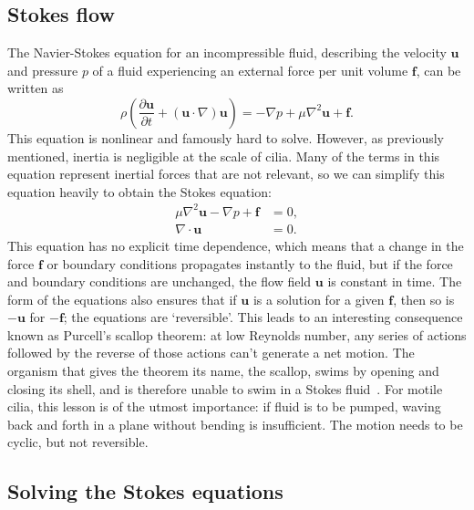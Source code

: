 \subsection{Stokes flow}

The Navier-Stokes equation for an incompressible fluid, describing the velocity $\mathbf{u}$ and pressure $p$ of a fluid experiencing an external force per unit volume $\mathbf{f}$, can be written as
\begin{equation}
    \rho \left( \frac{\partial \mathbf{u}}{\partial t} + \left( \mathbf{u} \cdot \nabla \right) \mathbf{u} \right) = -\nabla p + \mu \nabla^2 \mathbf{u} + \mathbf{f}.
\end{equation}
This equation is nonlinear and famously hard to solve. However, as previously mentioned, inertia is negligible at the scale of cilia. Many of the terms in this equation represent inertial forces that are not relevant, so we can simplify this equation heavily to obtain the Stokes equation:
\begin{align}
    \mu\nabla^2\mathbf{u}-\nabla p +\mathbf{f} &= 0,\\
    \nabla\cdot \mathbf{u} &= 0.
\end{align}
This equation has no explicit time dependence, which means that a change in the force $\mathbf{f}$ or boundary conditions propagates instantly to the fluid, but if the force and boundary conditions are unchanged, the flow field $\mathbf{u}$ is constant in time. The form of the equations also ensures that if $\mathbf{u}$ is a solution for a given $\mathbf{f}$, then so is $\mathbf{-u}$ for $\mathbf{-f}$; the equations are `reversible'. This leads to an interesting consequence known as Purcell's scallop theorem: at low Reynolds number, any series of actions followed by the reverse of those actions can't generate a net motion. The organism that gives the theorem its name, the scallop, swims by opening and closing its shell, and is therefore unable to swim in a Stokes fluid~. For motile cilia, this lesson is of the utmost importance: if fluid is to be pumped, waving back and forth in a plane without bending is insufficient. The motion needs to be cyclic, but not reversible. %

\subsection{Solving the Stokes equations}\label{subsec:solvingstokes}

